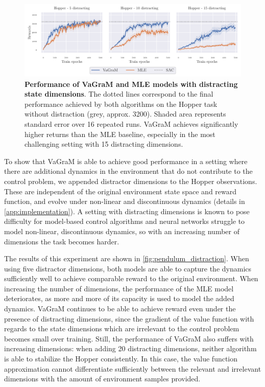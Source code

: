 \begin{figure}[t]
    \includegraphics[clip, trim=0.2cm 0.0cm 0.4cm 0.0cm, width=1.\linewidth]{figures/vagram/fig_1.pdf}
    \caption{\textbf{Performance of VaGraM and MLE models with distracting state dimensions}. The dotted lines correspond to the final performance achieved by both algorithms on the Hopper task without distraction (grey, approx. 3200). Shaded area represents standard error over 16 repeated runs. VaGraM achieves significantly higher returns than the MLE baseline, especially in the most challenging setting with 15 distracting dimensions.}
    \label{fig:pendulum_distraction}
\end{figure}

To show that VaGraM is able to achieve good performance in a setting where there are additional dynamics in the environment that do not contribute to the control problem, we appended distractor dimensions to the Hopper observations.
These are independent of the original environment state space and reward function, and evolve under non-linear and discontinuous dynamics (details in \autoref{app:implementation}).
A setting with distracting dimensions is known to pose difficulty for model-based control algorithms \parencite{Stone2021TheDC} and neural networks struggle to model non-linear, discontinuous dynamics, so with an increasing number of dimensions the task becomes harder.

The results of this experiment are shown in \autoref{fig:pendulum_distraction}.
When using five distractor dimensions, both models are able to capture the dynamics sufficiently well to achieve comparable reward to the original environment.
When increasing the number of dimensions, the performance of the MLE model deteriorates, as more and more of its capacity is used to model the added dynamics.
VaGraM continues to be able to achieve reward even under the presence of distracting dimensions, since the gradient of the value function with regards to the state dimensions which are irrelevant to the control problem becomes small over training.
Still, the performance of VaGraM also suffers with increasing dimensions: when adding 20 distracting dimensions, neither algorithm is able to stabilize the Hopper consistently.
In this case, the value function approximation cannot differentiate sufficiently between the relevant and irrelevant dimensions with the amount of environment samples provided.

